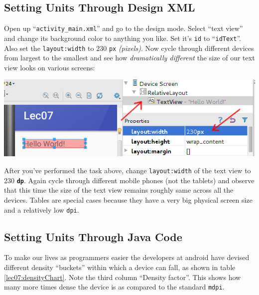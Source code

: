 \subsection{Setting Units Through Design XML}
\label{lec07:unitXML}
Open up ``\texttt{activity\_main.xml}'' and go to the design mode. Select ``text view'' and change its background color to anything you like. Set it's \texttt{id} to ``\texttt{idText}''. Also set the \texttt{layout:width} to 230 \texttt{px} \textit{(pixels)}. Now cycle through different devices from largest to the smallest and see how \textit{dramatically different} the size of our text view looks on various screens:
\begin{center}
	\includegraphics[scale=0.4]{chapters/ch06/images/3}
\end{center} 

After you've performed the task above, change \texttt{layout:width} of the text view to 230 \texttt{\textbf{dp}}. Again cycle through different mobile phones (not the tablets) and observe that this time the size of the text view remains roughly same across all the devices. Tables are special cases because they have a very big physical screen size and a relatively low \texttt{dpi}.

\subsection{Setting Units Through Java Code}
\label{lec07:unitJavaCode}
To make our lives as programmers easier the developers at android have devised different density ``buckets'' within which a device can fall, as shown in table \ref{lec07:densityChart}. Note the third column ``Density factor''. This shows how many more times dense the device is as compared to the standard \texttt{mdpi}. \\

